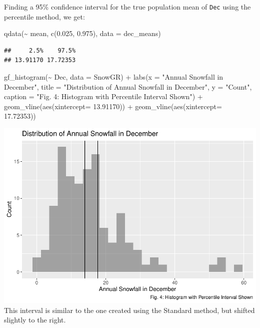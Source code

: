 \documentclass[12pt]{article}
\newenvironment{Shaded}{\begin{snugshade}}{\end{snugshade}}
\newcommand{\AttributeTok}[1]{\textcolor[rgb]{0.77,0.63,0.00}{#1}}
\newcommand{\FloatTok}[1]{\textcolor[rgb]{0.00,0.00,0.81}{#1}}
\newcommand{\FunctionTok}[1]{\textcolor[rgb]{0.00,0.00,0.00}{#1}}
\newcommand{\NormalTok}[1]{#1}
\newcommand{\SpecialCharTok}[1]{\textcolor[rgb]{0.00,0.00,0.00}{#1}}
\newcommand{\StringTok}[1]{\textcolor[rgb]{0.31,0.60,0.02}{#1}}
\begin{document}
Finding a 95\% confidence interval for the true population mean of
\texttt{Dec} using the percentile method, we get:

\begin{Shaded}
\begin{Highlighting}[]
\FunctionTok{qdata}\NormalTok{(}\SpecialCharTok{\textasciitilde{}}\NormalTok{ mean, }\FunctionTok{c}\NormalTok{(}\FloatTok{0.025}\NormalTok{, }\FloatTok{0.975}\NormalTok{), }\AttributeTok{data =}\NormalTok{ dec\_means)}
\end{Highlighting}
\end{Shaded}

\begin{verbatim}
##     2.5%    97.5% 
## 13.91170 17.72353
\end{verbatim}

\begin{Shaded}
\begin{Highlighting}[]
\FunctionTok{gf\_histogram}\NormalTok{(}\SpecialCharTok{\textasciitilde{}}\NormalTok{ Dec, }\AttributeTok{data =}\NormalTok{ SnowGR) }\SpecialCharTok{+}
  \FunctionTok{labs}\NormalTok{(}\AttributeTok{x =} \StringTok{"Annual Snowfall in December"}\NormalTok{, }
       \AttributeTok{title =} \StringTok{"Distribution of Annual Snowfall in December"}\NormalTok{, }\AttributeTok{y =} \StringTok{"Count"}\NormalTok{,}
       \AttributeTok{caption =} \StringTok{"Fig. 4: Histogram with Percentile Interval Shown"}\NormalTok{) }\SpecialCharTok{+}
  \FunctionTok{geom\_vline}\NormalTok{(}\FunctionTok{aes}\NormalTok{(}\AttributeTok{xintercept=} \FloatTok{13.91170}\NormalTok{)) }\SpecialCharTok{+}
  \FunctionTok{geom\_vline}\NormalTok{(}\FunctionTok{aes}\NormalTok{(}\AttributeTok{xintercept=} \FloatTok{17.72353}\NormalTok{))}
\end{Highlighting}
\end{Shaded}

\includegraphics{paper_files/figure-latex/unnamed-chunk-7-1.pdf} This
interval is similar to the one created using the Standard method, but
shifted slightly to the right.
\end{document}
